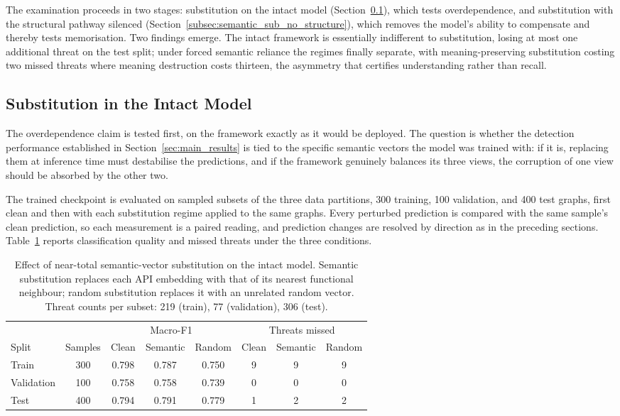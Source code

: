 \documentclass[%
    BCOR=10mm,
    DIV=13,
    toc=bibliography,
    toc=listof,
    oneside,
    12pt,
]{scrbook}
\begin{document}
The examination proceeds in two stages: substitution on the intact model
(Section~\ref{subsec:semantic_sub_intact}), which tests overdependence, and
substitution with the structural pathway silenced
(Section~\ref{subsec:semantic_sub_no_structure}), which removes the model's
ability to compensate and thereby tests memorisation. Two findings emerge.
The intact framework is essentially indifferent to substitution, losing at
most one additional threat on the test split; under forced semantic reliance
the regimes finally separate, with meaning-preserving substitution costing
two missed threats where meaning destruction costs thirteen, the asymmetry
that certifies understanding rather than recall.

\subsection{Substitution in the Intact Model}
\label{subsec:semantic_sub_intact}

The overdependence claim is tested first, on the framework exactly as it
would be deployed. The question is whether the detection performance
established in Section~\ref{sec:main_results} is tied to the specific
semantic vectors the model was trained with: if it is, replacing them at
inference time must destabilise the predictions, and if the framework
genuinely balances its three views, the corruption of one view should be
absorbed by the other two.

The trained checkpoint is evaluated on sampled subsets of the three data
partitions, 300 training, 100 validation, and 400 test graphs, first clean
and then with each substitution regime applied to the same graphs. Every
perturbed prediction is compared with the same sample's clean prediction, so
each measurement is a paired reading, and prediction changes are resolved by
direction as in the preceding sections.
Table~\ref{tab:semantic_sub_intact} reports classification quality and
missed threats under the three conditions.

\begin{table}[htbp]
\centering
\caption[Semantic-vector substitution in the intact model]{Effect of
near-total semantic-vector substitution on the intact model. Semantic
substitution replaces each API embedding with that of its nearest functional
neighbour; random substitution replaces it with an unrelated random vector.
Threat counts per subset: 219 (train), 77 (validation), 306 (test).}
\label{tab:semantic_sub_intact}
\small
\begin{tabular}{l c c c c c c c}
\toprule
& & \multicolumn{3}{c}{Macro-F1} & \multicolumn{3}{c}{Threats missed} \\
\cmidrule(lr){3-5} \cmidrule(lr){6-8}
Split & Samples & Clean & Semantic & Random & Clean & Semantic & Random \\
\midrule
Train      & 300 & 0.798 & 0.787 & 0.750 & 9 & 9 & 9 \\
Validation & 100 & 0.758 & 0.758 & 0.739 & 0 & 0 & 0 \\
Test       & 400 & 0.794 & 0.791 & 0.779 & 1 & 2 & 2 \\
\bottomrule
\end{tabular}
\end{table}
\end{document}
